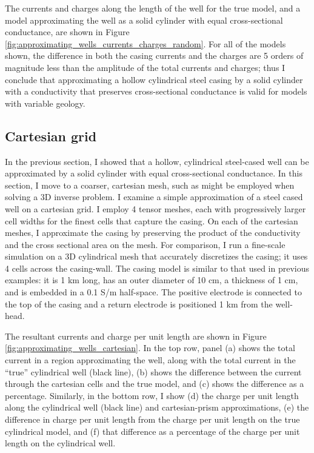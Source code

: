 

The currents and charges along the length of the well for the true model, and a model approximating the well as a solid cylinder with equal cross-sectional conductance, are shown in Figure \ref{fig:approximating_wells_currents_charges_random}. For all of the models shown, the difference in both the casing currents and the charges are 5 orders of magnitude less than the amplitude of the total currents and charges; thus I conclude that approximating a hollow cylindrical steel casing by a solid cylinder with a conductivity that preserves cross-sectional conductance is valid for models with variable geology.



\subsection{Cartesian grid}
\label{sec:approximating-cartesian}

In the previous section, I showed that a hollow, cylindrical steel-cased well can be approximated by a solid cylinder with equal cross-sectional conductance. In this section, I move to a coarser, cartesian mesh, such as might be employed when solving a 3D inverse problem. I examine a simple approximation of a steel cased well on a cartesian grid. I employ 4 tensor meshes, each with progressively larger cell widths for the finest cells that capture the casing. On each of the cartesian meshes, I approximate the casing by preserving the product of the conductivity and the cross sectional area on the mesh. For comparison, I run a fine-scale simulation on a 3D cylindrical mesh that accurately discretizes the casing; it uses 4 cells across the casing-wall. The casing model is similar to that used in previous examples: it is 1 km long, has an outer diameter of 10 cm, a thickness of 1 cm, and is embedded in a 0.1 S/m half-space. The positive electrode is connected to the top of the casing and a return electrode is positioned 1 km from the well-head.

The resultant currents and charge per unit length are shown in Figure \ref{fig:approximating_wells_cartesian}. In the top row, panel (a) shows the total current in a region approximating the well, along with the total current in the ``true'' cylindrical well (black line), (b) shows the difference between the current through the cartesian cells and the true model, and (c) shows the difference as a percentage. Similarly, in the bottom row, I show (d) the charge per unit length along the cylindrical well (black line) and cartesian-prism approximations, (e) the difference in charge per unit length from the charge per unit length on the true cylindrical model, and (f) that difference as a percentage of the charge per unit length on the cylindrical well.



